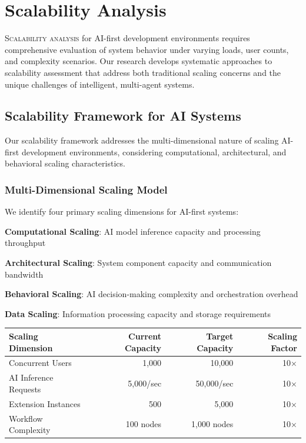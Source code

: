 
\section*{Scalability Analysis}

\lettrine{S}{calability analysis} for AI-first development environments requires comprehensive evaluation of system behavior under varying loads, user counts, and complexity scenarios. Our research develops systematic approaches to scalability assessment that address both traditional scaling concerns and the unique challenges of intelligent, multi-agent systems.

\subsection*{Scalability Framework for AI Systems}

Our scalability framework addresses the multi-dimensional nature of scaling AI-first development environments, considering computational, architectural, and behavioral scaling characteristics.

\subsubsection*{Multi-Dimensional Scaling Model}

We identify four primary scaling dimensions for AI-first systems:

\begin{expandedlist}
    \item \textbf{Computational Scaling}: AI model inference capacity and processing throughput
    \item \textbf{Architectural Scaling}: System component capacity and communication bandwidth
    \item \textbf{Behavioral Scaling}: AI decision-making complexity and orchestration overhead
    \item \textbf{Data Scaling}: Information processing capacity and storage requirements
\end{expandedlist}

\begin{center}
\begin{tabular}{@{}lrrr@{}}
\toprule
\textbf{Scaling Dimension} & \textbf{Current Capacity} & \textbf{Target Capacity} & \textbf{Scaling Factor} \\
\midrule
Concurrent Users & 1,000 & 10,000 & 10× \\
AI Inference Requests & 5,000/sec & 50,000/sec & 10× \\
Extension Instances & 500 & 5,000 & 10× \\
Workflow Complexity & 100 nodes & 1,000 nodes & 10× \\
\bottomrule
\end{tabular}
\end{center}

